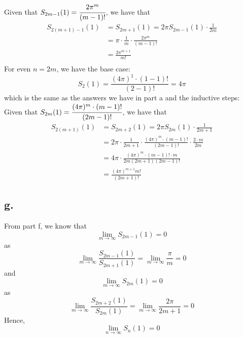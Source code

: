 \documentclass[11pt]{article}
\begin{document}
Given that $S_{2m-1}(1) = \cfrac{2\pi^m}{(m-1)!}$, we have that 
\begin{equation*}
    \begin{aligned}
        S_{2(m+1)-1}(1) 
        &= S_{2m+1}(1) = 2\pi S_{2m-1}(1) \cdot \frac{1}{2m} \\
        &=\pi \cdot \frac{1}{m} \cdot \frac{2\pi^m}{(m-1)!} \\
        &= \frac{2\pi^{m+1}}{m!} \\
    \end{aligned}
\end{equation*}
For even $n=2m$, we have the base case: 
\[
    S_2(1) = \frac{(4\pi)^1 \cdot (1-1)!}{(2-1)!} = 4\pi    
\]
which is the same as the answers we have in part a and the inductive steps: \\
Given that $S_{2m}(1) = \cfrac{(4\pi)^m \cdot (m-1)!}{(2m-1)!}$, we have that
\begin{equation*}
    \begin{aligned}
        S_{2(m+1)}(1) 
        &= S_{2m+2}(1) = 2\pi S_{2m}(1) \cdot \frac{1}{2m+1} \\
        &= 2\pi \cdot \frac{1}{2m+1} \cdot \frac{(4\pi)^m \cdot (m-1)!}{(2m-1)!} \cdot \frac{2 \cdot m}{2m} \\
        &= 4\pi \cdot \frac{(4\pi)^m \cdot (m-1)! \cdot m}{2m(2m+1)(2m-1)!} \\     
        &= \frac{(4\pi)^{m+1} m!}{(2m+1)!}   
    \end{aligned}
\end{equation*}
\subsection*{g.}
From part f, we know that 
\[
    \lim_{m\to \infty} S_{2m-1}(1) = 0     
\]
as 
\[ 
    \lim_{m\to \infty} \frac{S_{2m-1}(1)}{S_{2m+1}(1)} = \lim_{m\to \infty} \frac{\pi}{m} = 0
\]
and 
\[
    \lim_{m\to \infty} S_{2m}(1) = 0     
\]
as 
\[ 
    \lim_{m\to \infty} \frac{S_{2m+2}(1)}{S_{2m}(1)} = \lim_{m\to \infty} \frac{2\pi}{2m+1} = 0
\]
Hence, 
\[
    \lim_{n\to \infty} S_n(1) = 0    
\]
\pagebreak
\end{document}
